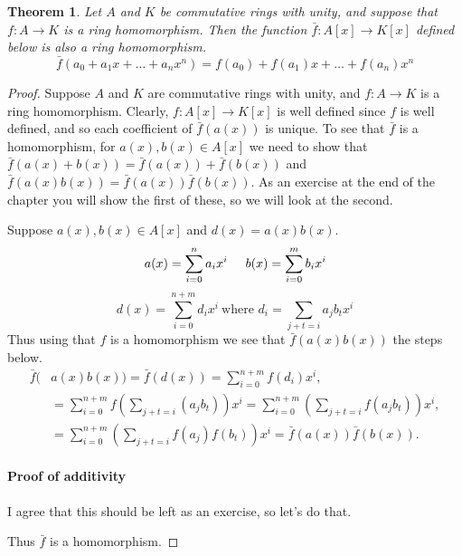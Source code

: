 \documentclass[letterpaper, 12pt]{article}
\newtheorem{thm}{Theorem}
\begin{document}
			\begin{thm}
			Let $A$ and $K$ be commutative rings with unity, and suppose that $f : A \to K$ is a ring homomorphism. 
			Then the function $\bar{f} : A[x] \to K[x]$ defined below is also a ring homomorphism. $$\bar{f}(a_{0} + a_{1}x + \dots + a_{n}x^{n}) = f(a_{0}) + f(a_{1})x + \dots + f(a_{n})x^{n}$$
			\end{thm}
			\color{ForestGreen}
			\begin{proof}
			Suppose $A$ and $K$ are commutative rings with unity, and $f : A \to K$ is a ring homomorphism. 
			Clearly, $f : A[x] \to K[x]$ is well defined since $f$ is well defined, and so each coefficient of $\bar{f}(a(x))$ is unique. 
			To see that $\bar{f}$ is a homomorphism, for $a(x), b(x) \in A[x]$ we need to show that $\bar{f}(a(x) + b(x)) = \bar{f}(a(x)) + \bar{f}(b(x))$ and $\bar{f}(a(x)b(x)) = \bar{f}(a(x))\bar{f}(b(x))$.
			As an exercise at the end of the chapter you will show the first of these, so we will look at the second.

			Suppose $a(x),b(x) \in A[x]$ and $d(x) = a(x)b(x)$. 
			\[ a(x) = \sum\limits_{i=0}^{n} a_{i}x^{i} \hspace*{5mm} b(x) = \sum\limits_{i=0}^{m} b_{i}x^{i} \]
			\[ d(x) = \sum\limits_{i=0}^{n+m} d_{i}x^{i} \ \text{where } d_{i} = \sum\limits_{j+t=i} a_{j}b_{t}x^{i} \]
			Thus using that $f$ is a homomorphism we see that $\bar{f}(a(x)b(x))$ the steps below.
			\begin{align*}
			\bar{f}(&a(x)b(x)) = \bar{f}(d(x)) = \sum\limits_{i=0}^{n+m} f(d_{i})x^{i}, \\
			&= \sum\limits_{i=0}^{n+m} f\left( \sum\limits_{j+t=i} (a_{j}b_{t}) \right) x^{i} = \sum\limits_{i=0}^{n+m} \left( \sum\limits_{j+t=i} f(a_{j}b_{t}) \right) x^{i}, \\
			&= \sum\limits_{i=0}^{n+m} \left( \sum\limits_{j+t=i} f(a_{j})f(b_{t}) \right) x^{i} = \bar{f}(a(x))\bar{f}(b(x)).
			\end{align*}

			\color{blue}
			\paragraph*{\color{blue} Proof of additivity}
			\label{par:proof_of_additivity}
			I agree that this should be left as an exercise, so let's do that.
			\vspace*{2mm}

			\color{ForestGreen}
			Thus $\bar{f}$ is a homomorphism.
			\end{proof}
			\color{black}
\end{document}
